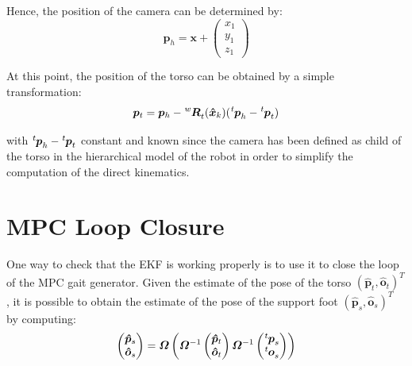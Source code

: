 \documentclass[a4paper]{article}
\begin{document}
Hence, the position of the camera can be determined by:
\begin{equation}
    \bm{p}_h
        =
    \bm{x} +
    \begin{pmatrix}
        x_1 \\
        y_1 \\
        z_1
    \end{pmatrix}
\end{equation}


At this point, the position of the torso can be obtained by
a simple transformation:
\begin{equation}
    \label{eq:torso-position-trilateration}
    \bm{p}_t = \bm{p}_h - \tensor[^w]{\bm{R}}{_t}(\bm{\hat{x}}_{k}) (\tensor[^t]{\bm{p}}{_h} - \tensor[^t]{\bm{p}}{_t})
\end{equation}

\noindent with $\tensor[^t]{\bm{p}}{_h} - \tensor[^t]{\bm{p}}{_t}$
constant and known
since the camera has been defined as child of the torso in
the hierarchical model of the robot in order to simplify the
computation of the direct kinematics.

\section{MPC Loop Closure}
\label{section:mpc-loop-closure}
One way to check that the EKF is working properly is to use it to close
the loop of the MPC gait generator. Given the estimate of the pose of the torso
$(\bm{\hat{p}}_t, \bm{\hat{o}}_t)^T$,
it is possible to obtain the estimate of the pose of the support foot
$(\bm{\hat{p}}_s, \bm{\hat{o}}_s)^T$ by computing:
\begin{equation}
    \begin{pmatrix}
        \bm{\hat{p}}_s \\
        \bm{\hat{o}}_s
    \end{pmatrix} = \bm{\varOmega}\left(\bm{\varOmega}^{-1}
        \begin{pmatrix}
            \bm{\hat{p}}_t \\
            \bm{\hat{o}}_t
        \end{pmatrix}\bm{\varOmega}^{-1}
        \begin{pmatrix}
            \tensor[^t]{\bm{p}}{_s} \\
            \tensor[^t]{\bm{o}}{_s}
        \end{pmatrix}
    \right)
\end{equation}
\end{document}
